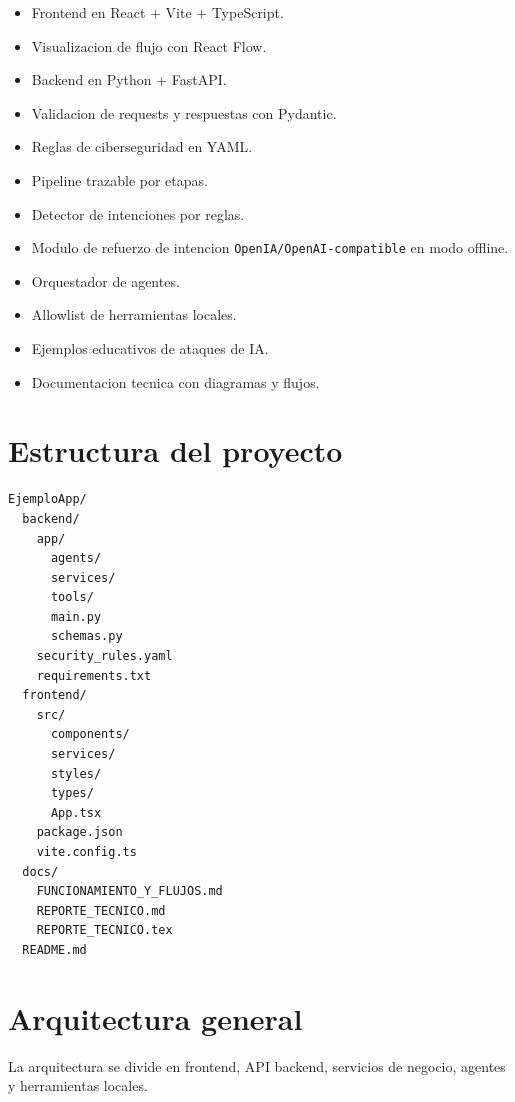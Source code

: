 \documentclass[12pt,letterpaper]{article}
\begin{document}
\begin{itemize}
  \item Frontend en React + Vite + TypeScript.
  \item Visualizacion de flujo con React Flow.
  \item Backend en Python + FastAPI.
  \item Validacion de requests y respuestas con Pydantic.
  \item Reglas de ciberseguridad en YAML.
  \item Pipeline trazable por etapas.
  \item Detector de intenciones por reglas.
  \item Modulo de refuerzo de intencion \texttt{OpenIA/OpenAI-compatible} en modo offline.
  \item Orquestador de agentes.
  \item Allowlist de herramientas locales.
  \item Ejemplos educativos de ataques de IA.
  \item Documentacion tecnica con diagramas y flujos.
\end{itemize}

\section{Estructura del proyecto}

\begin{lstlisting}[language={},caption={Estructura general del repositorio}]
EjemploApp/
  backend/
    app/
      agents/
      services/
      tools/
      main.py
      schemas.py
    security_rules.yaml
    requirements.txt
  frontend/
    src/
      components/
      services/
      styles/
      types/
      App.tsx
    package.json
    vite.config.ts
  docs/
    FUNCIONAMIENTO_Y_FLUJOS.md
    REPORTE_TECNICO.md
    REPORTE_TECNICO.tex
  README.md
\end{lstlisting}

\section{Arquitectura general}

La arquitectura se divide en frontend, API backend, servicios de negocio, agentes y herramientas locales.
\end{document}
